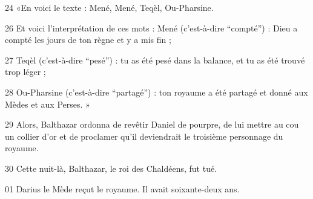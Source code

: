 24 «En voici le texte : Mené, Mené, Teqèl, Ou-Pharsine.

26 Et voici l’interprétation de ces mots : Mené (c’est-à-dire “compté”) : Dieu a compté les jours de ton règne et y a mis fin ;

27 Teqèl (c’est-à-dire “pesé”) : tu as été pesé dans la balance, et tu as été trouvé trop léger ;

28 Ou-Pharsine (c’est-à-dire “partagé”) : ton royaume a été partagé et donné aux Mèdes et aux Perses. »

29 Alors, Balthazar ordonna de revêtir Daniel de pourpre, de lui mettre au cou un collier d’or et de proclamer qu’il deviendrait le troisième personnage du royaume.

30 Cette nuit-là, Balthazar, le roi des Chaldéens, fut tué.

01 Darius le Mède reçut le royaume. Il avait soixante-deux ans.

